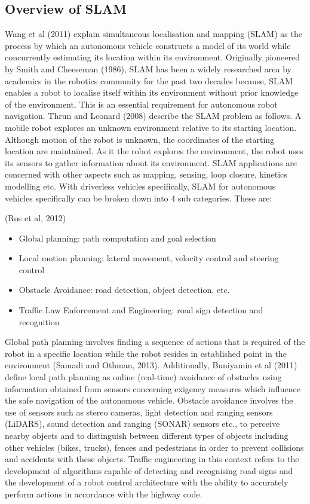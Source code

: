 \documentclass[a4paper, 12pt]{article}
\begin{document}
\subsection{Overview of SLAM}
Wang et al (2011) explain simultaneous localisation and mapping (SLAM) as the process by which an autonomous vehicle constructs a model of its world while concurrently estimating its location within its environment. Originally pioneered by Smith and Cheeseman (1986), SLAM has been a widely researched area by academics in the robotics community for the past two decades because, SLAM enables a robot to localise itself within its environment without prior knowledge of the environment. This is an essential requirement for autonomous robot navigation. Thrun and Leonard (2008) describe the SLAM problem as follows. A mobile robot explores an unknown environment relative to its starting location. Although motion of the robot is unknown, the coordinates of the starting location are maintained. As it the robot explores the environment, the robot uses its sensors to gather information about its environment. SLAM applications are concerned with other aspects such as mapping, sensing, loop closure, kinetics modelling etc. With driverless vehicles specifically, SLAM for autonomous vehicles specifically can be broken down into 4 sub categories. These are:

(Ros et al, 2012)
\begin{itemize}
 \item{Global planning: path computation and goal selection}
 \item{Local motion planning: lateral movement, velocity control and steering control}
 \item{Obstacle Avoidance: road detection, object detection, etc.}
 \item{Traffic Law Enforcement and Engineering: road sign detection and recognition}
\end{itemize}

\parskip 0.2in
Global path planning involves finding a sequence of actions that is required of the robot in a specific location while the robot resides in established point in the environment (Samadi and Othman, 2013). Additionally, Buniyamin et al (2011) define local path planning as online (real-time) avoidance of obstacles using information obtained from sensors concerning exigency measures which influence the safe navigation of the autonomous vehicle. Obstacle avoidance involves the use of sensors such as stereo cameras, light detection and ranging sensors (LiDARS), sound detection and ranging (SONAR) sensors etc., to perceive nearby objects and to distinguish between different types of objects including other vehicles (bikes, trucks), fences and pedestrians in order to prevent collisions and accidents with these objects. Traffic engineering in this context refers to the development of algorithms capable of detecting and recognising road signs and the development of a robot control architecture with the ability to accurately perform actions in accordance with the highway code. 
\end{document}
